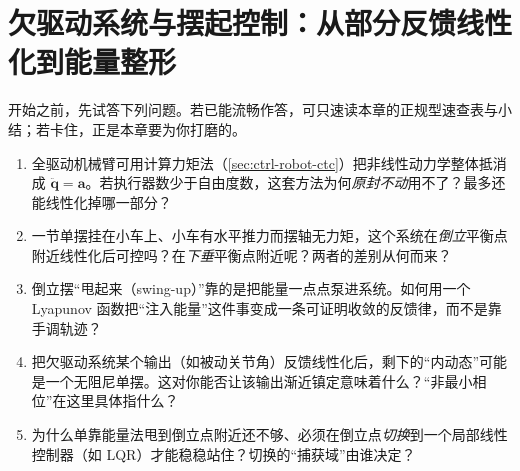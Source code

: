 \chapter{欠驱动系统与摆起控制：从部分反馈线性化到能量整形}
\label{ch:underactuated}


\begin{practice}[前置自测]
开始之前，先试答下列问题。若已能流畅作答，可只速读本章的正规型速查表与小结；若卡住，正是本章要为你打磨的。
\begin{enumerate}
  \item 全驱动机械臂可用计算力矩法（\cref{sec:ctrl-robot-ctc}）把非线性动力学整体抵消成 $\ddot{\mathbf{q}}=\mathbf{a}$。若执行器数少于自由度数，这套方法为何\emph{原封不动}用不了？最多还能线性化掉哪一部分？
  \item 一节单摆挂在小车上、小车有水平推力而摆轴无力矩，这个系统在\emph{倒立}平衡点附近线性化后可控吗？在\emph{下垂}平衡点附近呢？两者的差别从何而来？
  \item 倒立摆“甩起来（swing-up）”靠的是把能量一点点泵进系统。如何用一个 Lyapunov 函数把“注入能量”这件事变成一条可证明收敛的反馈律，而不是靠手调轨迹？
  \item 把欠驱动系统某个输出（如被动关节角）反馈线性化后，剩下的“内动态”可能是一个无阻尼单摆。这对你能否让该输出渐近镇定意味着什么？“非最小相位”在这里具体指什么？
  \item 为什么单靠能量法甩到倒立点附近还不够、必须在倒立点\emph{切换}到一个局部线性控制器（如 LQR）才能稳稳站住？切换的“捕获域”由谁决定？
\end{enumerate}
\end{practice}

